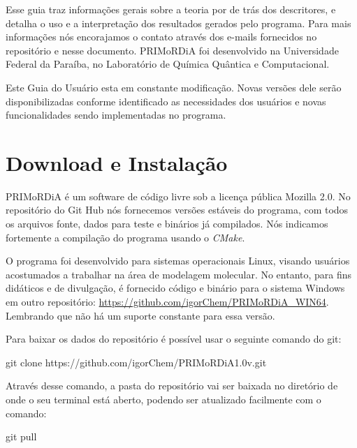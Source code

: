 \documentclass[a4paper,11pt]{refart}
\begin{document}
Esse guia traz informações gerais sobre a teoria por de trás dos descritores, e detalha o uso e a interpretação dos resultados gerados pelo programa. Para mais informações nós encorajamos o contato através dos e-mails fornecidos no repositório e nesse documento. PRIMoRDiA foi desenvolvido na Universidade Federal da Paraíba, no Laboratório de Química Quântica e Computacional.

Este Guia do Usuário esta em constante modificação. Novas versões dele serão disponibilizadas conforme identificado as necessidades dos usuários e novas funcionalidades sendo implementadas no programa.

\section{Download e Instalação}

PRIMoRDiA é um software de código livre sob a licença pública Mozilla 2.0. No repositório do Git Hub nós fornecemos versões estáveis do programa, com todos os arquivos fonte, dados para teste e binários já compilados. Nós indicamos fortemente a compilação do programa usando o \emph{CMake}. 

O programa foi desenvolvido para sistemas operacionais Linux, visando usuários acostumados a trabalhar na área de modelagem molecular. No entanto, para fins didáticos e de divulgação, é fornecido código e binário para o sistema Windows em outro repositório: \url{https://github.com/igorChem/PRIMoRDiA_WIN64}. Lembrando que não há um suporte constante para essa versão.

Para baixar os dados do repositório é possível usar o seguinte comando do git:

\hspace*{-\leftmarginwidth}
\begin{minipage}{\fullwidth}
	\begin{commandshell}git clone https://github.com/igorChem/PRIMoRDiA1.0v.git\end{commandshell}
\end{minipage}

Através desse comando, a pasta do repositório vai ser baixada no diretório de onde o seu terminal está aberto, podendo ser atualizado facilmente com o comando: 

\hspace*{-\leftmarginwidth}
\begin{minipage}{\fullwidth}
	\begin{commandshell}git pull\end{commandshell}
\end{minipage}
\end{document}
